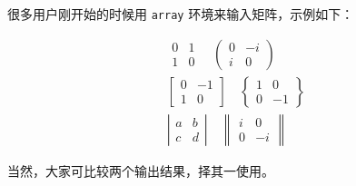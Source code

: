 很多用户刚开始的时候用 \verb|array| 环境来输入矩阵，示例如下：
\begin{latexcode}
\begin{gather*}
 \begin{array}{cc}  0 &  1 \\ 1 &  0 \end{array}  \quad
 \left(\begin{array}{cc}  0 & -i \\ i &  0 \end{array}\right) \\
 \left[\begin{array}{cc} 0 & -1 \\ 1 &  0 \end{array}\right] \quad
 \left\{\begin{array}{cc} 1 &  0 \\ 0 & -1 \end{array}\right\} \\
 \left|\begin{array}{cc} a &  b \\ c &  d \end{array}\right| \quad
 \left\|\begin{array}{cc} i &  0 \\ 0 & -i \end{array}\right\|
\end{gather*}
\end{latexcode}

当然，大家可比较两个输出结果，择其一使用。

